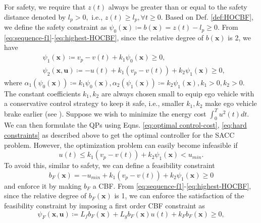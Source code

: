 \documentclass[letterpaper, 10 pt, conference]{ieeeconf}
\theoremstyle{definition}
\begin{document}
 For safety, we require that $z(t)$ always be greater than or equal to the safety distance denoted by $l_{p}>0,$ i.e., $z(t)\ge l_{p}, \forall t \ge 0.$ Based on Def. \ref{def:HOCBF}, we define the safety constraint as $\psi_{0}(\boldsymbol{x})\coloneqq b(\boldsymbol{x})=z(t)-l_{p}\ge 0.$ From \eqref{eq:sequence-f1}-\eqref{eq:highest-HOCBF}, since the relative degree of $b(\boldsymbol{x})$ is 2, we have
\begin{equation}
\label{eq:SACC-HOCBF-sequence}
\begin{split}
&\psi_{1}(\boldsymbol{x})\coloneqq v_{p}-v(t)+k_{1}\psi_{0}(\boldsymbol{x})\ge 0
,\\
&\psi_{2}(\boldsymbol{x},\boldsymbol{u})\coloneqq -u(t)+k_{1}(v_{p}-v(t))+k_{2}\psi_{1}(\boldsymbol{x})\ge 0,
\end{split}
\end{equation}
where $\alpha_{1}(\psi_{0}(\boldsymbol{x}))\coloneqq k_{1}\psi_{0}(\boldsymbol{x}), \alpha_{2}(\psi_{1}(\boldsymbol{x}))\coloneqq k_{2}\psi_{1}(\boldsymbol{x}), k_{1}>0, k_{2}>0.$ The constant coefficients $k_{1},k_{2}$ are always chosen small to equip ego vehicle with a conservative control strategy to keep it safe, i.e., smaller $k_{1},k_{2}$ make ego vehicle brake earlier (see \cite{xiao2021high}). Suppose we wish to minimize the energy cost $\int_{0}^{T} u^{2}(t)dt$. We can then formulate the QPs using Eqns. \eqref{eq:optimal control-cost}, \eqref{eq:hard constraints} as described above to get the optimal controller for the SACC problem. However, the optimization problem can easily become infeasible if 
\begin{equation}
u(t)\le k_{1}(v_{p}-v(t))+k_{2}\psi_{1}(\boldsymbol{x})<u_{min}.  
\end{equation}
To avoid this, similar to safety, we can define a feasibility constraint 
\begin{equation}
\label{eq:SACC-feasibility constraint}
b_{F}(\boldsymbol{x})=-u_{min}+k_{1}(v_{p}-v(t))+k_{2}\psi_{1}(\boldsymbol{x})\ge 0
\end{equation}
and enforce it by making $b_{F}$ a CBF. From \eqref{eq:sequence-f1}-\eqref{eq:highest-HOCBF}, since the relative degree of $b_{F}(\boldsymbol{x})$ is 1, we can enforce the satisfaction of the feasibility constraint by imposing a first order CBF constraint as 
\begin{equation}
\label{eq:SACC-HOCBF-feasibility}
\psi_{F}(\boldsymbol{x},\boldsymbol{u})\coloneqq L_{f}b_{F}(\boldsymbol{x})+L_{g}b_{F}(\boldsymbol{x})u(t)+k_{F}b_{F}(\boldsymbol{x})\ge 0,
\end{equation}
\end{document}
